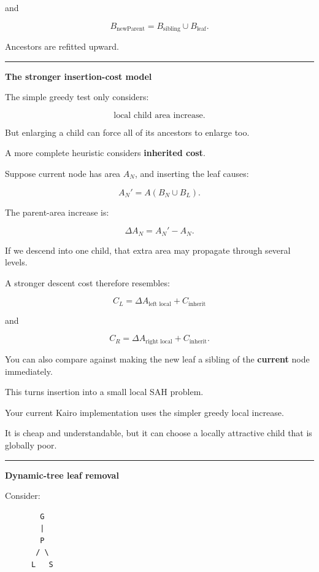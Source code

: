 and

\[
B_{\text{newParent}}
=
B_{\text{sibling}}
\cup
B_{\text{leaf}}.
\]

Ancestors are refitted upward.

\begin{center}\rule{0.5\linewidth}{0.5pt}\end{center}

\textbf{The stronger insertion-cost model}

The simple greedy test only considers:

\[
\text{local child area increase}.
\]

But enlarging a child can force all of its ancestors to enlarge too.

A more complete heuristic considers \textbf{inherited cost}.

Suppose current node has area \(A_N\), and inserting the leaf causes:

\[
A_N'
=
A(B_N\cup B_L).
\]

The parent-area increase is:

\[
\Delta A_N=A_N'-A_N.
\]

If we descend into one child, that extra area may propagate through several levels.

A stronger descent cost therefore resembles:

\[
C_L
=
\Delta A_{\text{left local}}
+
C_{\text{inherit}}
\]

and

\[
C_R
=
\Delta A_{\text{right local}}
+
C_{\text{inherit}}.
\]

You can also compare against making the new leaf a sibling of the \textbf{current} node immediately.

This turns insertion into a small local SAH problem.

Your current Kairo implementation uses the simpler greedy local increase.

It is cheap and understandable, but it can choose a locally attractive child that is globally poor.

\begin{center}\rule{0.5\linewidth}{0.5pt}\end{center}

\textbf{Dynamic-tree leaf removal}

Consider:

\begin{verbatim}
        G
        |
        P
       / \
      L   S
\end{verbatim}

